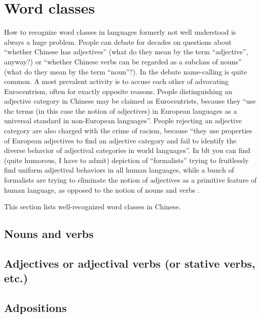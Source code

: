 \section{Word classes}\label{sec:word-class-intro}

How to recognize word classes in languages formerly not well understood is always a huge problem.
People can debate for decades on questions about ``whether Chinese has adjectives'' (what do they mean 
by the term ``adjective'', anyway?) or ``whether Chinese verbs can be regarded as a subclass of nouns''
(what do they mean by the term ``noun''?). In the debate name-calling is quite common. 
A most prevalent activity is to accuse each other of 
advocating Eurocentrism, often for exactly opposite reasons. People distinguishing an adjective 
category in Chinese may be claimed as Eurocentrists, because they ``use the terms (in this case 
the notion of adjectives) in European languages as a universal standard in non-European languages''.
People rejecting an adjective category are also charged with the crime of racism, because 
``they use properties of European adjectives to find an adjective category and fail to identify 
the diverse behavior of adjectival categories in world languages''. In \ac{blt} you can find 
(quite humorous, I have to admit) depiction of ``formalists'' trying to fruitlessly find uniform adjectival 
behaviors in all human languages, while a bunch of formalists are trying to eliminate the 
notion of adjectives as a primitive feature of human language, as opposed to the notion of nouns and verbs \citep{Mitrovi2020}.

This section lists well-recognized word classes in Chinese. %

\subsection{Nouns and verbs}

\subsection{Adjectives or adjectival verbs (or stative verbs, etc.)}

\subsection{Adpositions}


